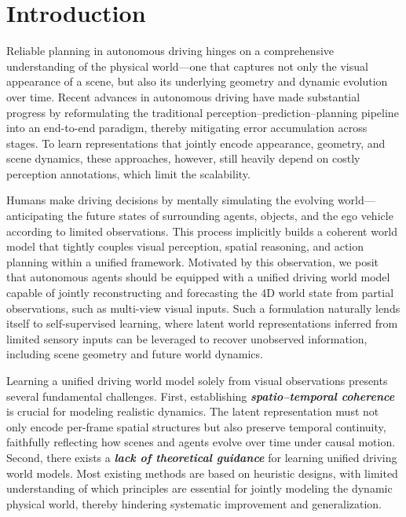 \section{Introduction}
\label{sec:intro}

Reliable planning in autonomous driving hinges on a comprehensive understanding of the physical world—one that captures not only the visual appearance of a scene, but also its underlying geometry and dynamic evolution over time. Recent advances in autonomous driving \cite{hu2023planning, jiang2023vad, chen2024vadv2, liao2025diffusiondrive, liu2025gaussianfusion} have made substantial progress by reformulating the traditional perception–prediction–planning pipeline into an end-to-end paradigm, thereby mitigating error accumulation across stages. To learn representations that jointly encode appearance, geometry, and scene dynamics, these approaches, however, still heavily depend on costly perception annotations, which limit the scalability.

Humans make driving decisions by mentally simulating the evolving world—anticipating the future states of surrounding agents, objects, and the ego vehicle according to limited observations. This process implicitly builds a coherent world model that tightly couples visual perception, spatial reasoning, and action planning within a unified framework. Motivated by this observation, we posit that autonomous agents should be equipped with a unified driving world model capable of jointly reconstructing and forecasting the 4D world state from partial observations, such as multi-view visual inputs. Such a formulation naturally lends itself to self-supervised learning, where latent world representations inferred from limited sensory inputs can be leveraged to recover unobserved information, including scene geometry and future world dynamics.

Learning a unified driving world model solely from visual observations presents several fundamental challenges. First, establishing \textbf{\emph{spatio--temporal coherence}} is crucial for modeling realistic dynamics. The latent representation must not only encode per-frame spatial structures but also preserve temporal continuity, faithfully reflecting how scenes and agents evolve over time under causal motion. Second, there exists a \textbf{\emph{lack of theoretical guidance}} for learning unified driving world models. Most existing methods \cite{epona, vggt, liu2025gaussianfusion} are based on heuristic designs, with limited understanding of which principles are essential for jointly modeling the dynamic physical world, thereby hindering systematic improvement and generalization.


